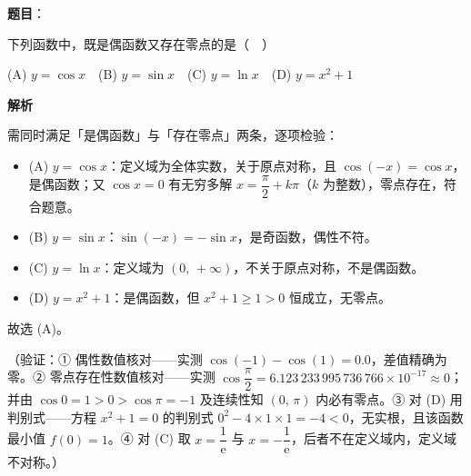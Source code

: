 \begin{answer}

\textbf{题目}：

下列函数中，既是偶函数又存在零点的是（　）

(A) \(y=\cos x\)　(B) \(y=\sin x\)　(C) \(y=\ln x\)　(D) \(y=x^2+1\)

\textbf{解析}

需同时满足「是偶函数」与「存在零点」两条，逐项检验：

\begin{itemize}
\item (A) \(y=\cos x\)：定义域为全体实数，关于原点对称，且 \(\cos(-x)=\cos x\)，是偶函数；又 \(\cos x=0\) 有无穷多解 \(x=\dfrac{\pi}{2}+k\pi\)（\(k\) 为整数），零点存在，符合题意。
\item (B) \(y=\sin x\)：\(\sin(-x)=-\sin x\)，是奇函数，偶性不符。
\item (C) \(y=\ln x\)：定义域为 \((0,\,+\infty)\)，不关于原点对称，不是偶函数。
\item (D) \(y=x^{2}+1\)：是偶函数，但 \(x^{2}+1\geqslant 1>0\) 恒成立，无零点。
\end{itemize}

故选 (A)。

（验证：① 偶性数值核对——实测 \(\cos(-1)-\cos(1)=0.0\)，差值精确为零。② 零点存在性数值核对——实测 \(\cos\dfrac{\pi}{2}=6.123\,233\,995\,736\,766\times10^{-17}\approx 0\)；并由 \(\cos 0=1>0>\cos\pi=-1\) 及连续性知 \((0,\,\pi)\) 内必有零点。③ 对 (D) 用判别式——方程 \(x^{2}+1=0\) 的判别式 \(0^{2}-4\times 1\times 1=-4<0\)，无实根，且该函数最小值 \(f(0)=1\)。④ 对 (C) 取 \(x=\dfrac{1}{\mathrm{e}}\) 与 \(x=-\dfrac{1}{\mathrm{e}}\)，后者不在定义域内，定义域不对称。）


\end{answer}
